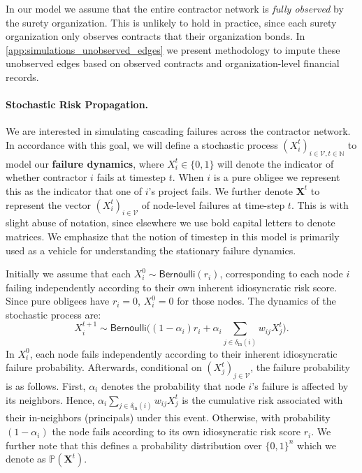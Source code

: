 \documentclass[mnsc,nonblindrev]{informs3}
\renewcommand{\Pr}{\mathbb{P}}
\newcommand{\din}{\delta_{\text{in}}}
\newcommand{\Xvec}{\mathbf{X}}
\newcommand{\Ber}{\textsf{Bernoulli}}
\begin{document}
\begin{remark}
In our model we assume that the entire contractor network is {\em fully observed} by the surety organization. This is unlikely to hold in practice, since each surety organization only observes contracts that their organization bonds. 
In \cref{app:simulations_unobserved_edges} we present methodology to impute these unobserved edges based on observed contracts and organization-level financial records.
\end{remark}

\paragraph{Stochastic Risk Propagation.} We are interested in simulating cascading failures across the contractor network.  In accordance with this goal, we will define a stochastic process $(X_i^t)_{i \in \mathcal{V}, t \in \mathbb{N}}$ to model our {\bf failure dynamics}, where $X_i^t \in \{0,1\}$ will denote the indicator of whether contractor $i$ fails at timestep $t$.  When $i$ is a pure obligee we represent this as the indicator that one of $i$'s project fails. We further denote $\Xvec^t$ to represent the vector $(X_i^t)_{i \in \mathcal{V}}$ of node-level failures at time-step $t$.  This is with slight abuse of notation, since elsewhere we use bold capital letters to denote matrices.  We emphasize that the notion of timestep in this model is primarily used as a vehicle for understanding the stationary failure dynamics.

Initially we assume that each $X_i^0 \sim \Ber(r_i)$, corresponding to each node $i$ failing independently according to their own inherent idiosyncratic risk score.  Since pure obligees have $r_i = 0$, $X_i^0 = 0$ for those nodes.  The dynamics of the stochastic process are:
\begin{equation}
\label{eq:sp_dynamics}
X_i^{t+1} \sim \Ber\Big((1 - \alpha_i) r_i + \alpha_i \sum_{j \in \din(i)} w_{ij} X_j^{t}\Big).
\end{equation}
In $X_i^0$, each node fails independently according to their inherent idiosyncratic failure probability.  Afterwards, conditional on $(X_j^{t})_{j \in \mathcal{V}}$, the failure probability is as follows.  First, $\alpha_i$ denotes the probability that node $i$'s failure is affected by its neighbors.  Hence, $\alpha_i \sum_{j \in \din(i)} w_{ij} X_j^{t}$ is the cumulative risk associated with their in-neighbors (principals) under this event. Otherwise, with probability $(1 - \alpha_i)$ the node fails according to its own idiosyncratic risk score $r_i$.
We further note that this defines a probability distribution over $\{0,1\}^n$ which we denote as $\Pr(\Xvec^t)$.  %
\end{document}
